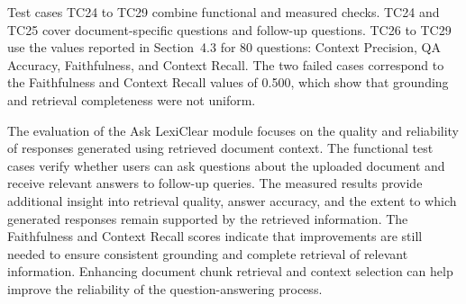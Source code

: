\documentclass[12pt,a4paper,oneside]{report}
\begin{document}
Test cases TC24 to TC29 combine functional and measured checks. TC24 and TC25 cover document-specific questions and follow-up questions. TC26 to TC29 use the values reported in Section~4.3 for 80 questions: Context Precision, QA Accuracy, Faithfulness, and Context Recall. The two failed cases correspond to the Faithfulness and Context Recall values of 0.500, which show that grounding and retrieval completeness were not uniform.

The evaluation of the Ask LexiClear module focuses on the quality and reliability of responses generated using retrieved document context. The functional test cases verify whether users can ask questions about the uploaded document and receive relevant answers to follow-up queries. The measured results provide additional insight into retrieval quality, answer accuracy, and the extent to which generated responses remain supported by the retrieved information. The Faithfulness and Context Recall scores indicate that improvements are still needed to ensure consistent grounding and complete retrieval of relevant information. Enhancing document chunk retrieval and context selection can help improve the reliability of the question-answering process.

\end{document}
